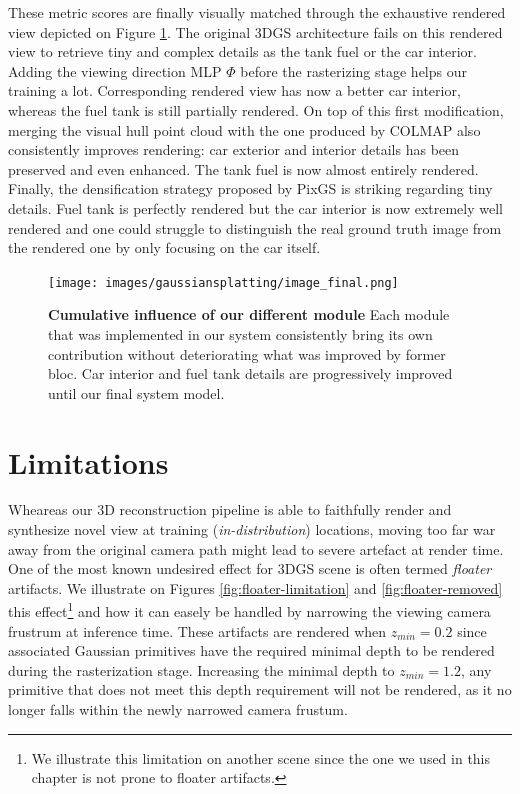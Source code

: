These metric scores are finally visually matched through the exhaustive rendered view depicted on Figure \ref{fig:gs-vh-result}. The original 3D\ac{GS} architecture fails on this rendered view to retrieve tiny and complex details as the tank fuel or the car interior. Adding the viewing direction \ac{MLP} $\Phi$ before the rasterizing stage helps our training a lot. Corresponding rendered view has now a better car interior, whereas the fuel tank is still partially rendered. On top of this first modification, merging the visual hull point cloud with the one produced by COLMAP also consistently improves rendering: car exterior and interior details has been preserved and even enhanced. The tank fuel is now almost entirely rendered. Finally, the densification strategy proposed by PixGS is striking regarding tiny details. Fuel tank is perfectly rendered but the car interior is now extremely well rendered and one could struggle to distinguish the real ground truth image from the rendered one by only focusing on the car itself.   

\begin{figure}[htb!]
  \center
\texttt{[image: images/gaussiansplatting/image\_final.png]}
\caption{\textbf{Cumulative influence of our different module} Each module that was implemented in our system consistently bring its own contribution without deteriorating what was improved by former bloc. Car interior and fuel tank details are progressively improved until our final system model.}
\label{fig:gs-vh-result}
\end{figure}

\section{Limitations}
\label{sec:gs-limitation}

Wheareas our 3D reconstruction pipeline is able to faithfully render and synthesize novel view at training (\textit{in-distribution}) locations, moving too far war away from the original camera path might lead to severe artefact at render time. One of the most known undesired effect for 3D\ac{GS} scene is often termed \textit{floater} artifacts. We illustrate on Figures \ref{fig:floater-limitation} and \ref{fig:floater-removed} this effect\footnote{We illustrate this limitation on another scene since the one we used in this chapter is not prone to floater artifacts.} and how it can easely be handled by narrowing the viewing camera frustrum at inference time. These artifacts are rendered when $z_{min}=0.2$ since associated Gaussian primitives have the required minimal depth to be rendered during the rasterization stage. Increasing the minimal depth to $z_{min}=1.2$, any primitive that does not meet this depth requirement will not be rendered, as it no longer falls within the newly narrowed camera frustum.

